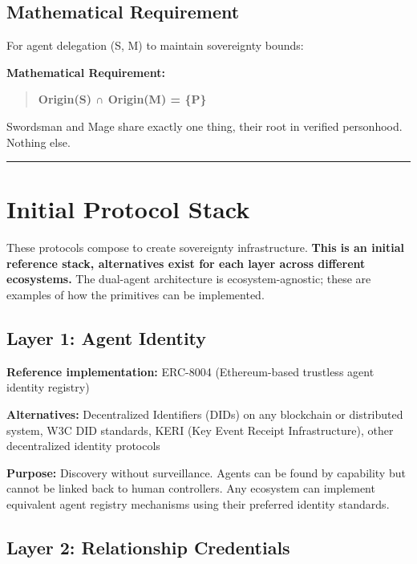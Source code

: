 \documentclass[
]{article}
\begin{document}
\subsection{Mathematical Requirement}\label{mathematical-requirement}

For agent delegation (S, M) to maintain sovereignty bounds:

\textbf{Mathematical Requirement:}

\begin{quote}
\textbf{Origin(S) ∩ Origin(M) = \{P\}}
\end{quote}

Swordsman and Mage share exactly one thing, their root in verified
personhood. Nothing else.

\begin{center}\rule{0.5\linewidth}{0.5pt}\end{center}

\section{Initial Protocol Stack}\label{initial-protocol-stack}

These protocols compose to create sovereignty infrastructure.
\textbf{This is an initial reference stack, alternatives exist for each
layer across different ecosystems.} The dual-agent architecture is
ecosystem-agnostic; these are examples of how the primitives can be
implemented.

\subsection{Layer 1: Agent Identity}\label{layer-1-agent-identity}

\textbf{Reference implementation:} ERC-8004 (Ethereum-based trustless
agent identity registry)

\textbf{Alternatives:} Decentralized Identifiers (DIDs) on any
blockchain or distributed system, W3C DID standards, KERI (Key Event
Receipt Infrastructure), other decentralized identity protocols

\textbf{Purpose:} Discovery without surveillance. Agents can be found by
capability but cannot be linked back to human controllers. Any ecosystem
can implement equivalent agent registry mechanisms using their preferred
identity standards.

\subsection{Layer 2: Relationship
Credentials}\label{layer-2-relationship-credentials}
\end{document}
